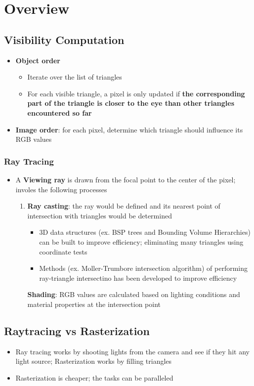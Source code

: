 \chapter{Overview}

\section{Visibility Computation}

  \begin{itemize}
    \item \textbf{Object order}
    \begin{itemize}
      \item Iterate over the list of triangles
      \item For each visible triangle, a pixel is only updated if \textbf{
      the corresponding part of the triangle is closer to the eye than
      other triangles encountered so far}
    \end{itemize}
    \item \textbf{Image order}: for each pixel, determine which triangle should
    influence its RGB values
  \end{itemize}

  \subsection{Ray Tracing}

    \begin{itemize}
      \item A \textbf{Viewing ray} is drawn from the focal point to the center
      of the pixel; involes the following processes
      \begin{enumerate}
        \item \textbf{Ray casting}: the ray would be defined and its nearest
        point of intersection with triangles would be determined
        \begin{itemize}
          \item 3D data structures (ex. BSP trees and
          Bounding Volume Hierarchies) can be built to improve efficiency;
          eliminating many triangles using coordinate tests
          \item Methods (ex. Moller-Trumbore intersection algorithm) of performing ray-triangle intersectino has been
          developed to improve efficiency
        \end{itemize}
        \textbf{Shading}: RGB values are calculated based on lighting
        conditions and material properties at the intersection point
      \end{enumerate}
    \end{itemize}

\section{Raytracing vs Rasterization}

  \begin{itemize}
    \item Ray tracing works by shooting lights from the camera and see if they
    hit any light source; Rasterization works by filling triangles
    \item Rasterization is cheaper; the tasks can be paralleled
  \end{itemize}
